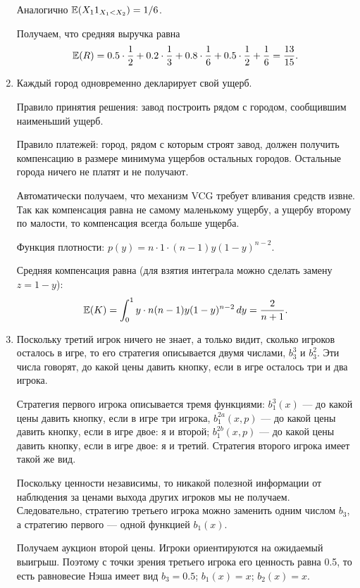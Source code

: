 \begin{enumerate}
Аналогично $ \operatorname{\mathbb{E}}(X_{1}1_{X_{1}<X_{2}})=1/6 $.

Получаем, что средняя выручка равна
\begin{equation}
\operatorname{\mathbb{E}}(R)=0.5\cdot \frac{1}{2}+0.2\cdot \frac{1}{3}+0.8\cdot \frac{1}{6}+0.5\cdot \frac{1}{2}+\frac{1}{6}=\frac{13}{15}.
\end{equation}

\item  Каждый город одновременно декларирует свой ущерб. 

Правило принятия решения: завод построить рядом с городом, сообщившим наименьший ущерб.

Правило платежей: город, рядом с которым строят завод, должен получить компенсацию в размере минимума ущербов остальных городов. Остальные города ничего не платят и не получают.

Автоматически получаем, что механизм VCG требует вливания средств извне. Так как компенсация равна не самому маленькому ущербу, а ущербу второму по малости, то компенсация всегда больше ущерба.

Функция плотности: $ p(y)=n\cdot 1\cdot (n-1)y(1-y)^{n-2} $.

Средняя компенсация равна (для взятия интеграла можно сделать замену $ z=1-y $):
\begin{equation}
\operatorname{\mathbb{E}}(K)=\int_{0}^{1}y\cdot n(n-1)y(1-y)^{n-2} \, dy=\frac{2}{n+1}.
\end{equation}


\item  Поскольку третий игрок ничего не знает, а только видит, сколько игроков осталось в игре, то его стратегия описывается двумя числами, $ b_{3}^{3} $ и $ b_{3}^{2} $. Эти числа говорят, до какой цены давить кнопку, если в игре осталось три и два игрока. 

Стратегия первого игрока описывается тремя функциями: $ b_{1}^{3}(x) $ — до какой цены давить кнопку, если в игре три игрока, $b_{1}^{2a}(x,p)$ — до какой цены давить кнопку, если в игре двое: я и второй; $b_{1}^{2b}(x,p)$ — до какой цены давить кнопку, если в игре двое: я и третий. Стратегия второго игрока имеет такой же вид.

Поскольку ценности независимы, то никакой полезной информации от наблюдения за ценами выхода других игроков мы не получаем. Следовательно, стратегию третьего игрока можно заменить одним числом $ b_{3} $, а стратегию первого — одной функцией $b_{1}(x)$.

Получаем аукцион второй цены. Игроки ориентируются на ожидаемый выигрыш. Поэтому с точки зрения третьего игрока его ценность равна 0.5, то есть равновесие Нэша имеет вид $ b_{3}=0.5 $; $ b_{1}(x)=x $; $ b_{2}(x)=x $.


\end{enumerate}
